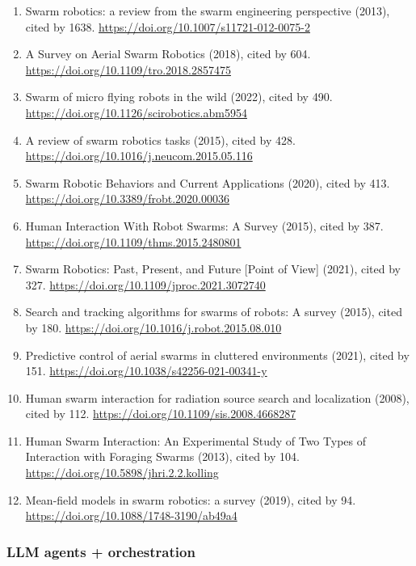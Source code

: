 \documentclass[11pt]{article}
\begin{document}
\begin{enumerate}
\def\labelenumi{\arabic{enumi}.}
\tightlist
\item
  Swarm robotics: a review from the swarm engineering perspective
  (2013), cited by 1638. \url{https://doi.org/10.1007/s11721-012-0075-2}
\item
  A Survey on Aerial Swarm Robotics (2018), cited by 604.
  \url{https://doi.org/10.1109/tro.2018.2857475}
\item
  Swarm of micro flying robots in the wild (2022), cited by 490.
  \url{https://doi.org/10.1126/scirobotics.abm5954}
\item
  A review of swarm robotics tasks (2015), cited by 428.
  \url{https://doi.org/10.1016/j.neucom.2015.05.116}
\item
  Swarm Robotic Behaviors and Current Applications (2020), cited by 413.
  \url{https://doi.org/10.3389/frobt.2020.00036}
\item
  Human Interaction With Robot Swarms: A Survey (2015), cited by 387.
  \url{https://doi.org/10.1109/thms.2015.2480801}
\item
  Swarm Robotics: Past, Present, and Future {[}Point of View{]} (2021),
  cited by 327. \url{https://doi.org/10.1109/jproc.2021.3072740}
\item
  Search and tracking algorithms for swarms of robots: A survey (2015),
  cited by 180. \url{https://doi.org/10.1016/j.robot.2015.08.010}
\item
  Predictive control of aerial swarms in cluttered environments (2021),
  cited by 151. \url{https://doi.org/10.1038/s42256-021-00341-y}
\item
  Human swarm interaction for radiation source search and localization
  (2008), cited by 112. \url{https://doi.org/10.1109/sis.2008.4668287}
\item
  Human Swarm Interaction: An Experimental Study of Two Types of
  Interaction with Foraging Swarms (2013), cited by 104.
  \url{https://doi.org/10.5898/jhri.2.2.kolling}
\item
  Mean-field models in swarm robotics: a survey (2019), cited by 94.
  \url{https://doi.org/10.1088/1748-3190/ab49a4}
\end{enumerate}

\hypertarget{llm-agents-orchestration}{%
\subsubsection{LLM agents +
orchestration}\label{llm-agents-orchestration}}
\end{document}

